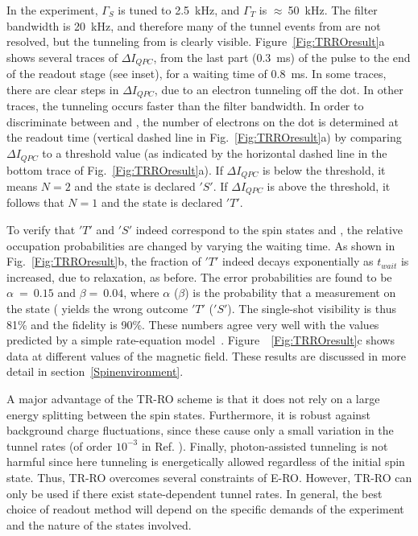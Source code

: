 \documentclass[rmp,twocolumn,aps]{revtex4}
\begin{document}
In the experiment, $\Gamma_S$ is tuned to 2.5~kHz, and $\Gamma_T$
is $\approx\:$50~kHz. The filter bandwidth is 20~kHz, and
therefore many of the tunnel events from  are not
resolved, but the tunneling from  is clearly visible.
Figure~\ref{Fig:TRROresult}a shows several traces of $\Delta
I_{QPC}$, from the last part (0.3~ms) of the pulse to the end of
the readout stage (see inset), for a waiting time of 0.8~ms. In
some traces, there are clear steps in $\Delta I_{QPC}$, due to an
electron tunneling off the dot. In other traces, the tunneling
occurs faster than the filter bandwidth. In order to discriminate
between  and , the number of electrons on the
dot is determined at the readout time (vertical dashed line in
Fig.~\ref{Fig:TRROresult}a) by comparing $\Delta I_{QPC}$ to a
threshold value (as indicated by the horizontal dashed line in the
bottom trace of Fig.~\ref{Fig:TRROresult}a). If $\Delta I_{QPC}$
is below the threshold, it means $N\!=\!2$ and the state is
declared $'S'$. If $\Delta I_{QPC}$ is above the threshold, it
follows that $N\!=\!1$ and the state is declared $'T'$.

To  verify that $'T'$ and $'S'$ indeed correspond to the spin
states  and , the relative occupation
probabilities are changed by varying the waiting time. As shown in
Fig.~\ref{Fig:TRROresult}b, the fraction of $'T'$ indeed decays
exponentially as $t_{wait}$ is increased, due to relaxation, as before. The error probabilities are
found to be $\alpha\!~=\!~0.15$ and $\beta\!=\!~0.04$, where $\alpha$ ($\beta$) is the probability that a measurement on the state  ( yields the wrong outcome $'T'$ ($'S'$). The single-shot visibility is thus
81\% and the fidelity is 90\%. These numbers agree very well with
the values predicted by a simple rate-equation
model~\cite{HansonPRL2005}. Figure~~\ref{Fig:TRROresult}c shows
data at different values of the magnetic field. These results are
discussed in more detail in section~\ref{Spinenvironment}.

A major advantage of the TR-RO scheme is that it does not rely on
a large energy splitting between the spin states. Furthermore, it
is robust against background charge fluctuations, since these
cause only a small variation in the tunnel rates (of order
$10^{-3}$ in Ref. \cite{FujisawaChargeNoise}). Finally,
photon-assisted tunneling is not harmful since here tunneling is
energetically allowed regardless of the initial spin state. Thus,
TR-RO overcomes several constraints of E-RO. However, TR-RO can
only be used if there exist state-dependent tunnel rates. In
general, the best choice of readout method will depend on the
specific demands of the experiment and the nature of the states
involved.
\end{document}
